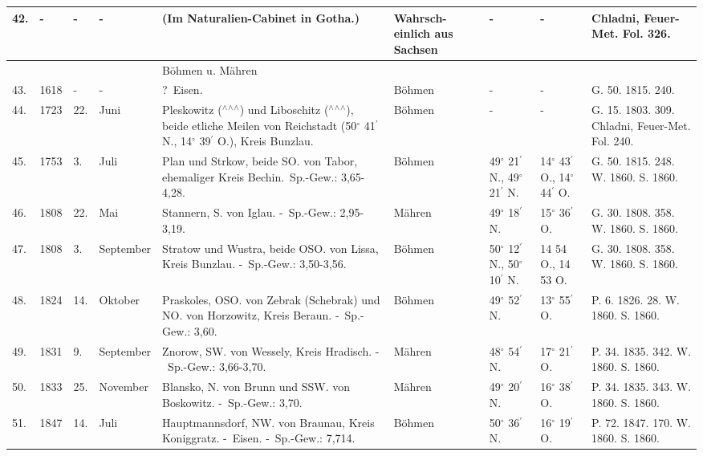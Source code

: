 \documentclass[a4paper, 8pt, oneside, polutonikogreek, german]{article}
\begin{document}
\begin{center}
\begin{longtable}{|p{3mm}|p{10mm}|p{5mm}|p{13mm}|p{25mm}|p{13mm}|p{10mm}|p{10mm}|p{11mm}|}
        42. & - & - & - & (Im Naturalien-Cabinet in Gotha.) & Wahrsch- einlich aus Sachsen & - & - & Chladni, Feuer-Met. Fol. 326. \\ \hline
         &   &   &   & Böhmen u. Mähren  &   &   &   &   \\ \hline
        43. & 1618 & - & - & ? Eisen. & Böhmen & - & - & G. 50. 1815. 240. \\ \hline
        44. & 1723 & 22. & Juni & Pleskowitz ($^\wedge$$^\wedge$$^\wedge$) und Liboschitz ($^\wedge$$^\wedge$$^\wedge$), beide etliche Meilen von Reichstadt (50$^\circ$ 41$^\prime$ N., 14$^\circ$ 39$^\prime$ O.), Kreis Bunzlau. & Böhmen & - & - & G. 15. 1803. 309. Chladni, Feuer-Met. Fol. 240. \\ \hline
        45. & 1753 & 3. & Juli & Plan und Strkow, beide SO. von Tabor, ehemaliger Kreis Bechin. Sp.-Gew.: 3,65-4,28. & Böhmen & 49$^\circ$ 21$^\prime$ N., 49$^\circ$ 21$^\prime$ N. & 14$^\circ$ 43$^\prime$ O., 14$^\circ$ 44$^\prime$ O. & G. 50. 1815. 248. W. 1860. S. 1860. \\ \hline
        46. & 1808 & 22. & Mai & Stannern, S. von Iglau. - Sp.-Gew.: 2,95-3,19. & Mähren & 49$^\circ$ 18$^\prime$ N. & 15$^\circ$ 36$^\prime$ O. & G. 30. 1808. 358. W. 1860. S. 1860. \\ \hline
        47. & 1808 & 3. & September & Stratow und Wustra, beide OSO. von Lissa, Kreis Bunzlau. - Sp.-Gew.: 3,50-3,56. & Böhmen & 50$^\circ$ 12$^\prime$ N., 50$^\circ$ 10$^\prime$ N. & 14 54 O., 14 53 O. & G. 30. 1808. 358. W. 1860. S. 1860. \\ \hline
        48. & 1824 & 14. & Oktober & Praskoles, OSO. von Zebrak (Schebrak) und NO. von Horzowitz, Kreis Beraun. - Sp.-Gew.: 3,60. & Böhmen & 49$^\circ$ 52$^\prime$ N. & 13$^\circ$ 55$^\prime$ O. & P. 6. 1826. 28. W. 1860. S. 1860. \\ \hline
        49. & 1831 & 9. & September & Znorow, SW. von Wessely, Kreis Hradisch. - Sp.-Gew.: 3,66-3,70. & Mähren & 48$^\circ$ 54$^\prime$ N. & 17$^\circ$ 21$^\prime$ O. & P. 34. 1835. 342. W. 1860. S. 1860. \\ \hline
        50. & 1833 & 25. & November & Blansko, N. von Brunn und SSW. von Boskowitz. - Sp.-Gew.: 3,70. & Mähren & 49$^\circ$ 20$^\prime$ N. & 16$^\circ$ 38$^\prime$ O. & P. 34. 1835. 343. W. 1860. S. 1860. \\ \hline
        51. & 1847 & 14. & Juli & Hauptmannsdorf, NW. von Braunau, Kreis Koniggratz. - Eisen. - Sp.-Gew.: 7,714. & Böhmen & 50$^\circ$ 36$^\prime$ N. & 16$^\circ$ 19$^\prime$ O. & P. 72. 1847. 170. W. 1860. S. 1860. \\ \hline

\end{longtable}
\end{center}
\end{document}
